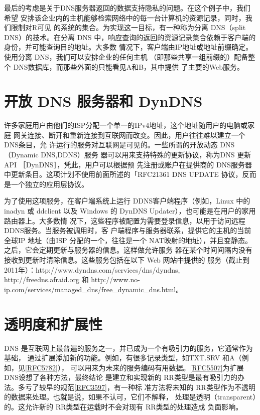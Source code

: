 最后的考虑是关于DNS服务器返回的数据支持隐私的问题。在这个例子中，我们希望
安排该企业内的主机能够检索网络中的每一台计算机的资源记录，同时，我们限制对R可见
的系统的集合。为实现这一目标，有一种称为分离 DNS（split DNS）的技术。在分离 DNS
中，响应查询的返回的资源记录集合依赖于客户端的身份，并可能查询目的地址。大多数
情况下，客户端由IP地址或地址前缀确定。使用分离 DNS，我们可以安排企业的任何主机
（即那些共享一组前缀的）配备整个 DNS数据库，而那些外面的只能看见A和B，其中提供
了主要的Web服务。

\section{开放 DNS 服务器和 DynDNS}

许多家庭用户由他们的ISP分配一个单一的IPv4地址，这个地址随用户的电脑或家庭
网关连接、断开和重新连接到互联网而改变。因此，用户往往难以建立一个 DNS条目，允
许运行的服务对互联网是可见的。一些所谓的开放动态 DNS（Dynamic DNS,DDNS）服务
器可以用来支持特殊的更新协议，称为DNS 更新 API ［DynDNS］，凭此，用户可以根据预
先注册或账户在提供商的 DNS服务器中更新条目。这项计划不使用前面所述的「RFC21361
DNS UPDATE 协议，反而是一个独立的应用层协议。

为了使用这项服务，在客户端系统上运行 DDNS客户端程序（例如，Linux 中的 inadyn
或 ddclient 以及 Windows 的 DynDNS Updater），也可能是在用户的家用路由器上。大多数情
况下，这些程序被配置为需要登录信息，以用于访问远程DDNS服务。当服务被调用时，客
户端程序与服务器联系，提供它的主机的当前全球IP 地址（由ISP 分配的一个，往往是一个
NAT映射的地址），并且变静态。之后，它会定期更新与服务器的信息。这样做允许服务
器在某个时间间隔内没有接收到更新时清除信息。这些服务包括在以下 Web 网站中提供的
服务（截止到2011年）：http://www.dyndns.com/services/dns/dyndns, http://freedns.afraid.org
和 http://www.no-ip.com/services/managed\_dns/free\_dynamic\_dns.html。

\section{透明度和扩展性}

DNS 是互联网上最普遍的服务之一，并已成为一个有吸引力的服务，它通常作为基础，
通过扩展添加新的功能。例如，有很多记录类型，如TXT.SRV 和A（例如，见\href{https://www.rfc-editor.org/rfc/rfc5782}{[RFC5782]}），
可以用来为未来的服务编码有用数据。\href{https://www.rfc-editor.org/rfc/rfc5507}{[RFC5507]}为扩展 DNS设想了各种方法，最终结论
是建立和实现新的 RR类型是最有吸引力的办法。多亏了较早的规范\href{https://www.rfc-editor.org/rfc/rfc3597}{[RFC3597]}，有一种标
准方法将未知的 RR类型作为不透明的数据来处理。也就是说，如果不认可，它们不解释，
处理是透明（transparent）的。这允许新的 RR类型在运载时不会对现有 RR类型的处理造成
负面影响。


